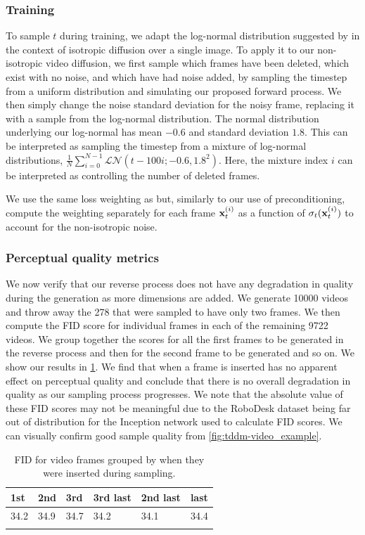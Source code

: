 \subsubsection{Training}
To sample $t$ during training, we adapt the log-normal distribution suggested by \citet{karras2022elucidating} in the context of isotropic diffusion over a single image. To apply it to our non-isotropic video diffusion, we first sample which frames have been deleted, which exist with no noise, and which have had noise added, by sampling the timestep from a uniform distribution and simulating our proposed forward process. We then simply change the noise standard deviation for the noisy frame, replacing it with a sample from the log-normal distribution. The normal distribution underlying our log-normal has mean $-0.6$ and standard deviation $1.8$. 
%
This can be interpreted as sampling the timestep from a mixture of log-normal distributions, $\frac{1}{N}\sum_{i=0}^{N-1} \mathcal{LN}(t-100i; -0.6, 1.8^2)$. Here, the mixture index $i$ can be interpreted as controlling the number of deleted frames.

We use the same loss weighting as \citet{karras2022elucidating} but, similarly to our use of preconditioning, compute the weighting separately for each frame ${\mathbf{x}}_t^{(i)}$ as a function of $\sigma_t({\mathbf{x}}_t^{(i)})$ to account for the non-isotropic noise.

\subsubsection{Perceptual quality metrics}
We now verify that our reverse process does not have any degradation in quality during the generation as more dimensions are added. We generate 10000 videos and throw away the 278 that were sampled to have only two frames. We then compute the FID score for individual frames in each of the remaining 9722 videos. We group together the scores for all the first frames to be generated in the reverse process and then for the second frame to be generated and so on. We show our results in \cref{tab:fid-by-insertion-order}. We find that when a frame is inserted has no apparent effect on perceptual quality and conclude that there is no overall degradation in quality as our sampling process progresses. We note that the absolute value of these FID scores may not be meaningful due to the RoboDesk dataset being far out of distribution for the Inception network used to calculate FID scores. We can visually confirm good sample quality from \cref{fig:tddm-video_example}.
\begin{table}[ht]
\centering
\caption{FID for video frames grouped by when they were inserted during sampling.}
\begin{tabular}{p{1.5cm}p{1.5cm}p{1.5cm}|p{1.5cm}p{1.5cm}p{1.5cm}}
\toprule
1st & 2nd & 3rd & 3rd last & 2nd last & last \\
\midrule
34.2 & 34.9 & 34.7 & 34.2 & 34.1 & 34.4 \\
\bottomrule
\label{tab:fid-by-insertion-order}
\end{tabular}
\end{table}